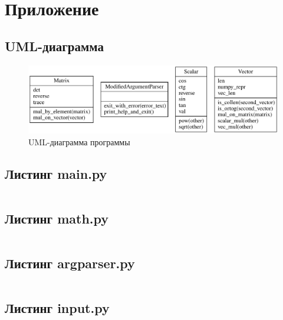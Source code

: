 \documentclass[a4paper,14pt]{extarticle}
\begin{document}
\newpage

\section*{Приложение}

\subsection*{UML-диаграмма}
\begin{figure}[H]
	\includegraphics[width=\textwidth]{include/uml_diagram.pdf}
	\caption{UML-диаграмма программы}
\end{figure}

\subsection*{Листинг main.py}
\inputminted[mathescape,linenos,breaklines]{python}{../src/main.py}

\subsection*{Листинг math.py}
\inputminted[mathescape,linenos,breaklines]{python}{../src/models/math.py}

\subsection*{Листинг argparser.py}
\inputminted[mathescape,linenos,breaklines]{python}{../src/utils/argparser.py}

\subsection*{Листинг input.py}
\inputminted[mathescape,linenos,breaklines]{python}{../src/utils/input.py}
\end{document}
